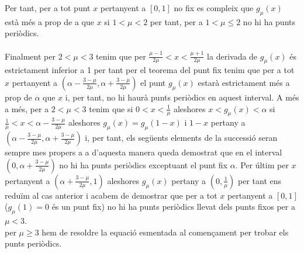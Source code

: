 \documentclass[a4paper,10pt]{article}
\renewcommand{\*}{\cdot}
\renewcommand{\a}{\alpha}
\renewcommand{\u}{\mu}
\begin{document}
Per tant, per a tot punt $x$ pertanyent a $[0,1]$ no fix es compleix que  $g_{\u}(x)$ està més a prop de a que $x$ si $1<\u<2$ per tant, per a $1<\u\le2$ no hi ha punts
periòdics.\\
\phantom{.}\\
Finalment per $2<\u<3$ tenim que per $\frac{\u-1}{2\u}<x<\frac{\u+1}{2\u}$ la derivada de $g_{\u}(x)$ és estrictament inferior a 1 per tant per el teorema del punt fix 
tenim que per a tot $x$ pertanyent a  $\left(\a-\frac{3-\u}{2\u},\a+\frac{3-\u}{2\u}\right)$ el punt $g_{\u}(x)$ estarà estrictament més a prop de $\a$
que $x$ i, per tant, no hi haurà punts periòdics en aquest interval.
A més a més, per a $2<\u<3$ tenim que si $0<x<\frac{1}{\u}$ aleshores $x<g_{\u}(x)<\a$ si $\frac{1}{\u}<x<\a-\frac{3-\u}{2\u}$ aleshores $g_{\u}(x)=g_{\u}(1-x)$ i
$1-x$ pertany a $\left(\a-\frac{3-\u}{2\u},\a+\frac{3-\u}{2\u}\right)$ i, per tant, els següents elements de la successió seran sempre mes propers a a d'aquesta manera
queda demostrat que en el interval $\left(0, \a+\frac{3-\u}{2\u}\right)$ no hi ha punts periòdics exceptuant el punt fix $\a$.
Per últim per $x$ pertanyent a $\left(\a+\frac{3-\u}{2\u}, 1\right)$ aleshores $g_{\u}(x)$ pertany a $\left(0,\frac{1}{\u}\right)$ per tant ens reduïm al cas anterior i
acabem de demostrar que per a tot $x$ pertanyent a $[0,1]$ ($g_{\u}(1)=0$ és un punt fix) no hi ha punts periòdics llevat dels punts fixos per
a $\u<3$.\\
per $\u\ge3$ hem de resoldre la equació esmentada al començament per trobar els punts periòdics.
\end{document}
